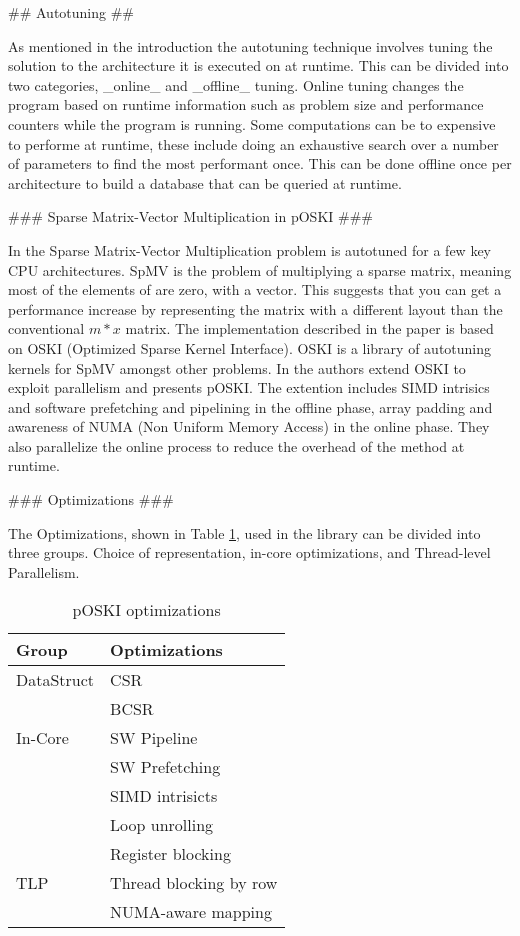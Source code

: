 \begin{markdown}

## Autotuning ##

As mentioned in the introduction the autotuning technique involves
tuning the solution to the architecture it is executed on at
runtime. This can be divided into two categories, _online_ and
_offline_ tuning. Online tuning changes the program based on
runtime information such as problem size and performance counters
while the program is running. Some computations can be to expensive to
performe at runtime, these include doing an exhaustive search over a
number of parameters to find the most performant once. This can be
done offline once per architecture to build a database that can be
queried at runtime.

### Sparse Matrix-Vector Multiplication in pOSKI ###

In \cite{auto} the Sparse Matrix-Vector Multiplication problem is
autotuned for a few key CPU architectures. SpMV is the problem of
multiplying a sparse matrix, meaning most of the elements of are zero,
with a vector. This suggests that you can get a performance increase
by representing the matrix with a different layout than the
conventional $m*x$ matrix. The implementation described in the paper
is based on OSKI \cite{oski} (Optimized Sparse Kernel Interface). OSKI
is a library of autotuning kernels for SpMV amongst other problems.
In \cite{auto} the authors extend OSKI to exploit parallelism and
presents pOSKI. The extention includes SIMD intrisics and software
prefetching and pipelining in the offline phase, array padding and
awareness of NUMA (Non Uniform Memory Access) in the online
phase. They also parallelize the online process to reduce the overhead
of the method at runtime.

### Optimizations  ###

The Optimizations, shown in Table \ref{tab:poksi}, used in the library can be divided into three
groups. Choice of representation, in-core optimizations, and
Thread-level Parallelism.

\begin{table}[H]
  \centering
  \begin{tabular}[H]{|l|l|}
    \hline
    Group      & Optimizations\\
    \hline
    \hline
    DataStruct & CSR\\
    & BCSR\\
    \hline
    In-Core& SW Pipeline\\
    & SW Prefetching\\
    & SIMD intrisicts\\
    & Loop unrolling\\
    & Register blocking\\
    \hline
    TLP&Thread blocking by row\\
    &NUMA-aware mapping\\
    \hline
  \end{tabular}
  \caption{pOSKI optimizations}
  \label{tab:poksi}
\end{table}


\end{markdown}
